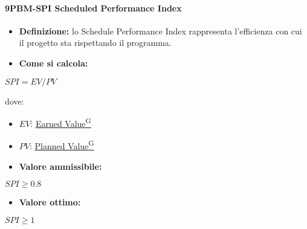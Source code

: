 \paragraph*{9PBM-SPI Scheduled Performance Index}
\begin{itemize}
    \item \textbf{Definizione:} lo Schedule Performance Index rappresenta l’efficienza con cui il progetto sta rispettando il programma.
    \item \textbf{Come si calcola:}
\end{itemize}
\begin{center}
   $SPI = EV/PV$ 
\end{center}
dove:
\begin{itemize}[label=$\rightarrow$]
    \item $EV$: \href{https://code7crusaders.github.io/docs/RTB/documentazione_interna/glossario.html#earned-value}{Earned Value\textsuperscript{G}}
    \item $PV$: \href{https://code7crusaders.github.io/docs/RTB/documentazione_interna/glossario.html#planned-value}{Planned Value\textsuperscript{G}}
\end{itemize}
\begin{itemize}
    \item \textbf{Valore ammissibile:}
\end{itemize}
\begin{center}
    $SPI \geq 0.8$
\end{center}
\begin{itemize}
    \item \textbf{Valore ottimo:}
\end{itemize}
\begin{center}
    $SPI \geq 1$
\end{center}

